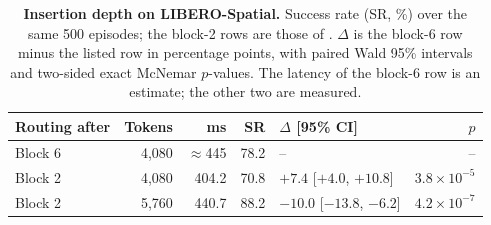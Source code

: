 \begin{table}[t]
  \centering
  \caption{\textbf{Insertion depth on LIBERO-Spatial.}
  Success rate (SR, \%) over the same 500 episodes; the block-2 rows are those of .
  $\Delta$ is the block-6 row minus the listed row in percentage points, with paired Wald 95\% intervals and two-sided exact McNemar $p$-values.
  The latency of the block-6 row is an estimate; the other two are measured.}
  \label{tab:supp_depth}
  \footnotesize
  \setlength{\tabcolsep}{2.5pt}
  \begin{tabular}{@{}lrrrlr@{}}
    \toprule
    Routing after & Tokens & ms & SR & $\Delta$ [95\% CI] & $p$ \\
    \midrule
    Block 6 & 4,080 & $\approx$445 & 78.2 & -- & -- \\
    Block 2 & 4,080 & 404.2 & 70.8 & $+7.4$ [$+4.0$, $+10.8$] & $3.8\!\times\!10^{-5}$ \\
    Block 2 & 5,760 & 440.7 & 88.2 & $-10.0$ [$-13.8$, $-6.2$] & $4.2\!\times\!10^{-7}$ \\
    \bottomrule
  \end{tabular}
\end{table}
